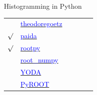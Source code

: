 \documentclass[aspectratio=169]{beamer}
\begin{document}
\begin{frame}{Histogramming in Python}
\begin{tabular}{c l c p{2.5 cm} p{1.5 cm} p{4 cm}}
& \href{https://github.com/theodoregoetz/histogram}{\textcolor{blue}{theodoregoetz}} & & & & \\
$\surd$ & \href{https://pypi.org/project/paida}{\textcolor{blue}{paida}} & & & \\
$\surd$ & \href{https://pypi.org/project/rootpy}{\textcolor{blue}{rootpy}} & & & & \\
& \href{https://pypi.org/project/root_numpy}{\textcolor{blue}{root\_numpy}} & & & & \\
& \href{https://yoda.hepforge.org/pydoc}{\textcolor{blue}{YODA}} & & & & \\
& \href{https://root.cern.ch/pyroot}{\textcolor{blue}{PyROOT}} & & & & \\
\end{tabular}
\end{frame}







\end{document}
